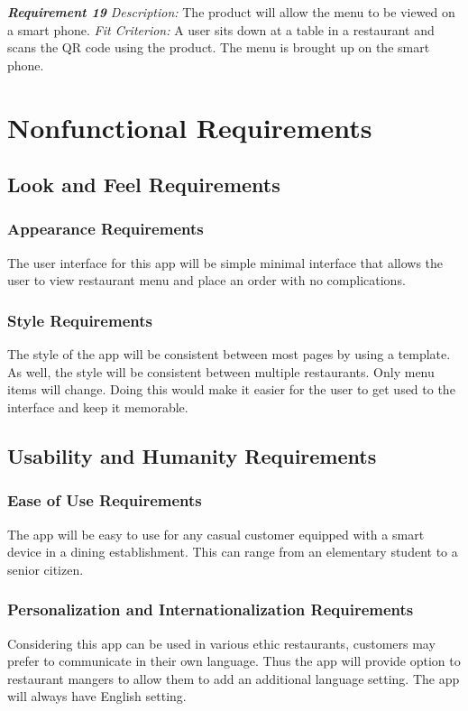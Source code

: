 \documentclass[12pt, titlepage]{article}
\begin{document}
\textbf{\textit{Requirement 19}}\newline
\textit{Description:}\newline
The product will allow the menu to be viewed on a smart phone. \newline\newline
\textit{Fit Criterion:}\newline 
A user sits down at a table in a restaurant and scans the QR code using the product. The menu is brought up on the smart phone.
\newline

\section{Nonfunctional Requirements}
\subsection{Look and Feel Requirements}
\subsubsection{Appearance Requirements}
The user interface for this app will be simple minimal interface that allows the user to view restaurant menu and place an order with no complications. 
\subsubsection{Style Requirements}
The style of the app will be consistent between most pages by using a template. As well, the style will be consistent between multiple restaurants. Only menu items will change. Doing this would make it easier for the user to get used to the interface and keep it memorable.
\subsection{Usability and Humanity Requirements}
\subsubsection{Ease of Use Requirements}
 The app will be easy to use for any casual customer equipped with a smart device in a dining establishment. This can range from an elementary student to a senior citizen.  
\subsubsection{Personalization and Internationalization Requirements}
Considering this app can be used in various ethic restaurants, customers may prefer to communicate in their own language. Thus the app will provide option to restaurant mangers to allow them to add an additional language setting. The app will always have English setting.
\end{document}
